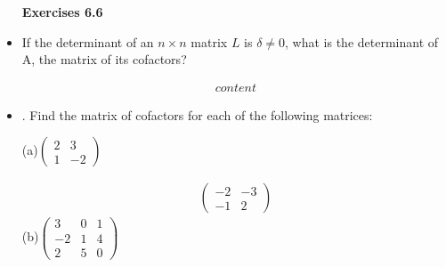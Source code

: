 \documentclass[10pt]{extarticle}
\newcommand{\itembf}[1]{\item[\textbf{#1}]}
\begin{document}
\begin{itemize}
		\begin{large}
		\textbf{Exercises 6.6 }
	\end{large}	
		
		\itembf{2.}	If the determinant of an $n\times n$ matrix $L $ is $\delta\neq0$, what is the determinant of A, the matrix
		of its cofactors?

				\begin{gather*}
					content
				\end{gather*}
		
		\itembf{4.}. Find the matrix of cofactors for each of the following matrices:
		
		(a)$\begin{pmatrix}
			2&3 \\
			1&-2
		\end{pmatrix}$
		
		\begin{gather*}
			\begin{pmatrix}
				-2&-3 \\
				-1&2
			\end{pmatrix}
		\end{gather*}
		(b)$\begin{pmatrix}
			3&0&1 \\
			-2&1&4\\
			2&5&0
		\end{pmatrix}$ 
		

\end{itemize}
\end{document}
